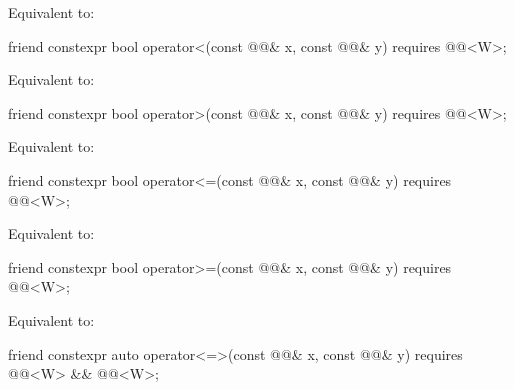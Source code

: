 \begin{itemdescr}
\pnum
\effects
Equivalent to: 
\end{itemdescr}

\begin{itemdecl}
friend constexpr bool operator<(const @@& x, const @@& y)
  requires @@<W>;
\end{itemdecl}

\begin{itemdescr}
\pnum
\effects
Equivalent to: 
\end{itemdescr}

\begin{itemdecl}
friend constexpr bool operator>(const @@& x, const @@& y)
  requires @@<W>;
\end{itemdecl}

\begin{itemdescr}
\pnum
\effects
Equivalent to: 
\end{itemdescr}

\begin{itemdecl}
friend constexpr bool operator<=(const @@& x, const @@& y)
  requires @@<W>;
\end{itemdecl}

\begin{itemdescr}
\pnum
\effects
Equivalent to: 
\end{itemdescr}

\begin{itemdecl}
friend constexpr bool operator>=(const @@& x, const @@& y)
  requires @@<W>;
\end{itemdecl}

\begin{itemdescr}
\pnum
\effects
Equivalent to: 
\end{itemdescr}

\begin{itemdecl}
friend constexpr auto operator<=>(const @@& x, const @@& y)
  requires @@<W> && @@<W>;
\end{itemdecl}

